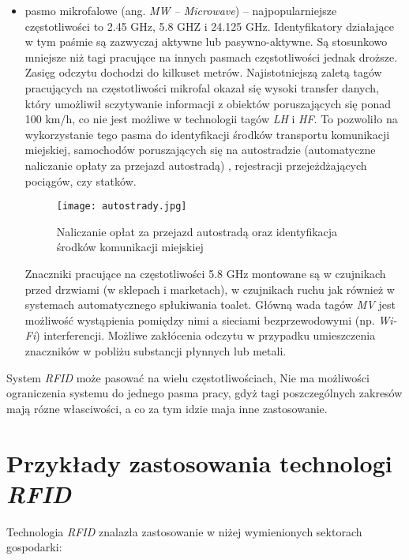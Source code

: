 \begin{itemize}
	\item pasmo mikrofalowe (ang. \emph{MW – Microwave}) – najpopularniejsze częstotliwości to 2.45 GHz, 5.8 GHZ i 24.125 GHz.  
Identyfikatory działające w tym paśmie są zazwyczaj aktywne lub pasywno-aktywne. Są stosunkowo mniejsze niż tagi pracujące na innych pasmach częstotliwości jednak droższe. Zasięg odczytu dochodzi do kilkuset metrów. Najistotniejszą zaletą tagów pracujących na częstotliwości mikrofal okazał się wysoki transfer danych, który  umożliwił sczytywanie informacji z obiektów poruszających się ponad 100 km/h, co nie jest możliwe w technologii tagów \emph{LH} i \emph{HF}.  To pozwoliło na wykorzystanie tego pasma do identyfikacji środków transportu komunikacji miejskiej, samochodów poruszających się  na autostradzie (automatyczne naliczanie opłaty za przejazd autostradą) , rejestracji przejeżdżających pociągów, czy statków.

	\begin{figure}[h!]
	\centering
	    \texttt{[image: autostrady.jpg]}
	    \caption{Naliczanie opłat za przejazd autostradą oraz identyfikacja środków komunikacji miejskiej}
	\end{figure}

	Znaczniki pracujące na częstotliwości 5.8 GHz montowane są w czujnikach przed drzwiami (w sklepach i marketach), w czujnikach ruchu jak również w systemach automatycznego spłukiwania toalet.
	Główną wada tagów \emph{MV} jest możliwość wystąpienia pomiędzy nimi a sieciami bezprzewodowymi (np. \emph{Wi-Fi}) interferencji. Możliwe zakłócenia odczytu w przypadku umieszczenia znaczników w pobliżu substancji płynnych lub metali.

\end{itemize}

System \emph{RFID} może pasować na wielu częstotliwościach, Nie ma możliwości ograniczenia systemu do jednego pasma pracy, gdyż tagi poszczególnych zakresów mają rózne własciwości, a co za tym idzie maja inne zastosowanie.

\newpage

\section{Przykłady zastosowania technologi \emph{RFID}}

Technologia \emph{RFID} znalazła zastosowanie w niżej wymienionych sektorach gospodarki: 

